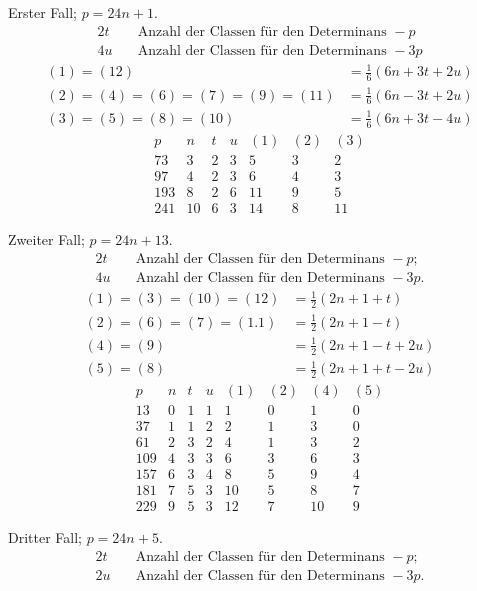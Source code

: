 Erster Fall; $p=24n+1$.
\[
\begin{aligned}
2t&\quad\text{Anzahl der Classen für den Determinans }-p\\
4u&\quad\text{Anzahl der Classen für den Determinans }-3p
\end{aligned}
\]
\[
\begin{aligned}
(1)=(12)&=\tfrac16(6n+3t+2u)\\
(2)=(4)=(6)=(7)=(9)=(11)&=\tfrac16(6n-3t+2u)\\
(3)=(5)=(8)=(10)&=\tfrac16(6n+3t-4u)
\end{aligned}
\]
\[
\begin{array}{r|r|r|r|r|r|r}
p&n&t&u&(1)&(2)&(3)\\\hline
73&3&2&3&5&3&2\\
97&4&2&3&6&4&3\\
193&8&2&6&11&9&5\\
241&10&6&3&14&8&11
\end{array}
\]

Zweiter Fall; $p=24n+13$.
\[
\begin{aligned}
2t&\quad\text{Anzahl der Classen für den Determinans }-p;\\
4u&\quad\text{Anzahl der Classen für den Determinans }-3p.
\end{aligned}
\]
\[
\begin{aligned}
(1)=(3)=(10)=(12)&=\tfrac12(2n+1+t)\\
(2)=(6)=(7)=(1.1)&=\tfrac12(2n+1-t)\\
(4)=(9)&=\tfrac12(2n+1-t+2u)\\
(5)=(8)&=\tfrac12(2n+1+t-2u)
\end{aligned}
\]
\[
\begin{array}{r|r|r|r|r|r|r|r}
p&n&t&u&(1)&(2)&(4)&(5)\\\hline
13&0&1&1&1&0&1&0\\
37&1&1&2&2&1&3&0\\
61&2&3&2&4&1&3&2\\
109&4&3&3&6&3&6&3\\
157&6&3&4&8&5&9&4\\
181&7&5&3&10&5&8&7\\
229&9&5&3&12&7&10&9
\end{array}
\]

Dritter Fall; $p=24n+5$.
\[
\begin{aligned}
2t&\quad\text{Anzahl der Classen für den Determinans }-p;\\
2u&\quad\text{Anzahl der Classen für den Determinans }-3p.
\end{aligned}
\]


